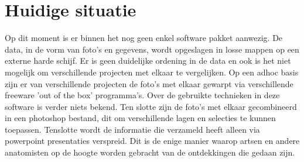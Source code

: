 \section{Huidige situatie}
\label{huidigesituatie}
Op dit moment is er binnen het \casamproject nog geen enkel software pakket aanwezig.
De data, in de vorm van foto's en gegevens, wordt opgeslagen in losse mappen op een externe harde schijf. 
Er is geen duidelijke ordening in de data en ook is het niet mogelijk om verschillende projecten met elkaar te vergelijken.
Op een adhoc basis zijn er van verschillende projecten de foto's met elkaar gewarpt via verschillende freeware 'out of the box' programma's. Over de gebruikte technieken in deze software is verder niets bekend. Ten slotte zijn de foto's met elkaar gecombineerd in een photoshop bestand, dit om verschillende lagen en selecties te kunnen toepassen.
Tenslotte wordt de informatie die \casam verzameld heeft alleen via powerpoint presentaties verspreid. Dit is de enige manier waarop artsen en andere anatomisten op de hoogte worden gebracht van de ontdekkingen die gedaan zijn.

